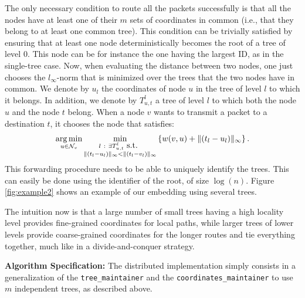 \documentclass[conference]{IEEEtran}
\def\argmin{\mathop{\rm arg\,min}}
\def\cN{\mathcal{N}}
\begin{document}
The only necessary condition to route all the packets successfully is that all the nodes have at least one of their $m$ sets of coordinates in common (i.e., that they belong to at least one common tree). This condition 
can be trivially satisfied by ensuring that at least one node deterministically becomes the root of a tree of level $0$. 
This node can be for instance the one having the largest ID, as in the single-tree case.
Now, when evaluating the distance between two nodes, one just chooses the $l_\infty$-norm that is minimized over the trees that the two nodes have in common.
We denote by $u_l$ the coordinates of node $u$ in the tree of level $l$ to which it belongs. In addition, we denote by $T_{u,t}^l$ a tree of level $l$ to which both the node $u$ and the node $t$ belong.
When a node $v$ wants to transmit a packet to a destination $t$, it chooses the node that satisfies:
\begin{eqnarray}
\label{eq:forwardcost2}
\argmin_{u \in \cN_v} \min_{\substack{l \mbox{ } : \mbox{ } \exists T_{u,t}^l \mbox{ s.t. }\\
 \lVert(t_l-u_l)\rVert_\infty < \lVert(t_l-v_l)\rVert_\infty}}
\left\{ w(v,u) +  \lVert (t_l-u_l)  \rVert_\infty \right\}.
\end{eqnarray}
This forwarding procedure needs to be able to uniquely identify the trees. This can easily be done using the identifier of the root, of size $\log(n)$.
Figure \ref{fig:example2} shows an example of our embedding using several trees.

The intuition now is that a large number of small trees having a high locality level provides fine-grained coordinates for local paths, while larger trees of lower levels provide coarse-grained coordinates for the longer routes and tie everything together, much like in a divide-and-conquer strategy.


\textbf{Algorithm Specification: }
The distributed implementation simply consists in a generalization of the \texttt{tree\_maintainer} and the \texttt{coordinates\_maintainer} to use $m$ independent trees, as described above.
\end{document}
